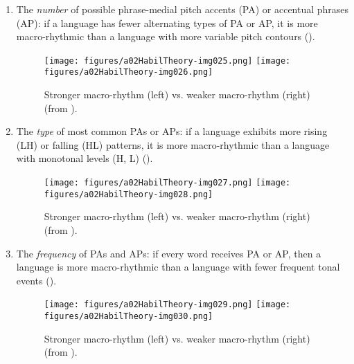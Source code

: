 \begin{enumerate}[label={(\arabic*)}]\sloppy
\item The \textit{number} of possible phrase-medial pitch accents (PA) or accentual phrases (AP): if a language has fewer alternating types of PA or AP, it is more macro-rhythmic than a language with more variable pitch contours ().


\begin{figure}[H]

\texttt{[image: figures/a02HabilTheory-img025.png]}
\texttt{[image: figures/a02HabilTheory-img026.png]}


\caption{Stronger macro-rhythm (left) vs. weaker macro-rhythm (right) (from \citealt[525]{Jun2014}).}
\label{fig:2.16}
\end{figure}

\item The \textit{type} of most common PAs or APs: if a language exhibits more rising (LH) or falling (HL) patterns, it is more macro-rhythmic than a language with monotonal levels (H, L) ().



\begin{figure}[H]
\texttt{[image: figures/a02HabilTheory-img027.png]}
\texttt{[image: figures/a02HabilTheory-img028.png]}




\caption{Stronger macro-rhythm (left) vs. weaker macro-rhythm (right) (from \citealt[525]{Jun2014}).}
\label{fig:2.17}
\end{figure}

\item The \textit{frequency} of PAs and APs: if every word receives PA or AP, then a language is more macro-rhythmic than a language with fewer frequent tonal events ().


  \begin{figure}[H]

\texttt{[image: figures/a02HabilTheory-img029.png]}
\texttt{[image: figures/a02HabilTheory-img030.png]}




\caption{Stronger macro-rhythm (left) vs. weaker macro-rhythm (right) (from \citealt[525]{Jun2014}).}
\label{fig:2.18}
\end{figure}
\end{enumerate}

